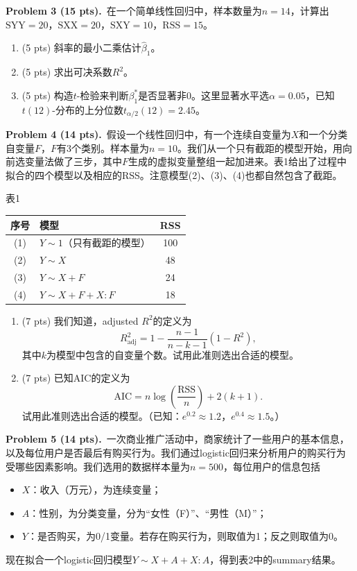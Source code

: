 \documentclass[UTF8,a4paper,11pt,fontset=fandol]{ctexart}
\newcommand{\problem}[2]{\par\addvspace{10pt}\Needspace{5\baselineskip}\textbf{Problem #1 (#2 pts).}\ }
\newcommand{\tabletitle}[1]{\par\smallskip\begin{center}#1\end{center}\vspace{-5pt}}
\begin{document}
\problem{3}{15}在一个简单线性回归中，样本数量为$n=14$，计算出$\mathrm{SYY}=20$，$\mathrm{SXX}=20$，$\mathrm{SXY}=10$，$\mathrm{RSS}=15$。
\begin{enumerate}[label=\arabic*.]
  \item (5 pts) 斜率的最小二乘估计$\widehat\beta_1$。
  \item (5 pts) 求出可决系数$R^2$。
  \item (5 pts) 构造$t$-检验来判断$\beta_1^*$是否显著非0。这里显著水平选$\alpha=0.05$，已知$t(12)$-分布的上分位数$t_{\alpha/2}(12)=2.45$。
\end{enumerate}

\problem{4}{14}假设一个线性回归中，有一个连续自变量为$X$和一个分类自变量$F$，$F$有3个类别。样本量为$n=10$。我们从一个只有截距的模型开始，用向前选变量法做了三步，其中$F$生成的虚拟变量整组一起加进来。表1给出了过程中拟合的四个模型以及相应的RSS。注意模型(2)、(3)、(4)也都自然包含了截距。

\tabletitle{表1}
\begin{center}
\renewcommand{\arraystretch}{1.15}
\begin{tabular}{clc}
\toprule
序号 & 模型 & RSS\\
\midrule
(1) & $Y\sim1$（只有截距的模型） & 100\\
(2) & $Y\sim X$ & 48\\
(3) & $Y\sim X+F$ & 24\\
(4) & $Y\sim X+F+X:F$ & 18\\
\bottomrule
\end{tabular}
\end{center}
\begin{enumerate}[label=\arabic*.]
  \item (7 pts) 我们知道，adjusted $R^2$的定义为
  \begin{equation*}
    R_{\mathrm{adj}}^2=1-\frac{n-1}{n-k-1}(1-R^2),
  \end{equation*}
  其中$k$为模型中包含的自变量个数。试用此准则选出合适的模型。
  \item (7 pts) 已知AIC的定义为
  \begin{equation*}
    \mathrm{AIC}=n\log\left(\frac{\mathrm{RSS}}{n}\right)+2(k+1).
  \end{equation*}
  试用此准则选出合适的模型。（已知：$e^{0.2}\approx1.2$，$e^{0.4}\approx1.5$。）
\end{enumerate}

\newpage
\problem{5}{14}一次商业推广活动中，商家统计了一些用户的基本信息，以及每位用户是否最后有购买行为。我们通过logistic回归来分析用户的购买行为受哪些因素影响。我们选用的数据样本量为$n=500$，每位用户的信息包括
\begin{itemize}
  \item $X$：收入（万元），为连续变量；
  \item $A$：性别，为分类变量，分为“女性（F）”、“男性（M）”；
  \item $Y$：是否购买，为0/1变量。若存在购买行为，则取值为1；反之则取值为0。
\end{itemize}
现在拟合一个logistic回归模型$Y\sim X+A+X:A$，得到表2中的summary结果。
\end{document}
